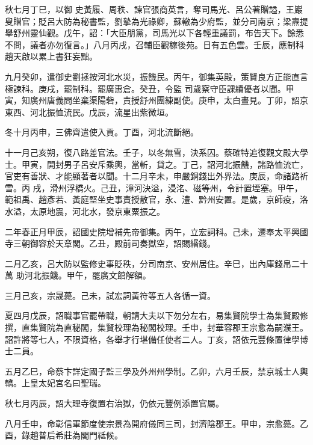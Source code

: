 \begin{pinyinscope}
 秋七月丁巳，以御
 史黃履、周秩、諫官張商英言，奪司馬光、呂公著贈謚，王巖叟贈官；貶呂大防為秘書監，劉摯為光祿卿，蘇轍為少府監，並分司南京；梁燾提舉舒州靈仙觀。戊午，詔：「大臣朋黨，司馬光以下各輕重議罰，布告天下。餘悉不問，議者亦勿復言。」八月丙戌，召輔臣觀稼後苑。日有五色雲。壬辰，應制科趙天啟以累上書狂妄黜。



 九月癸卯，遣御史劉拯按河北水災，振饑民。丙午，御集英殿，策賢良方正能直言極諫科。庚戌，罷制科。罷廣惠倉。癸丑，令監
 司歲察守臣課績優者以聞。甲寅，知廣州唐義問坐棄渠陽砦，責授舒州團練副使。庚申，太白晝見。丁卯，詔京東西、河北振恤流民。戊辰，流星出紫微垣。



 冬十月丙申，三佛齊遣使入貢。丁酉，河北流斷絕。



 十一月己亥朔，復八路差官法。壬子，以冬無雪，決系囚。蔡確特追復觀文殿大學士。甲寅，開封男子呂安斥乘輿，當斬，貸之。丁己，詔河北振饑，諸路恤流亡，官吏有善狀、才能顯著者以聞。十二月辛未，申嚴銅錢出外界法。庚辰，命諸路祈雪。丙
 戌，滑州浮橋火。己丑，漳河決溢，浸洺、磁等州，令計置堙塞。甲午，範祖禹、趙彥若、黃庭堅坐史事責授散官，永、澧、黔州安置。是歲，京師疫，洛水溢，太原地震，河北水，發京東粟振之。



 二年春正月甲辰，詔國史院增補先帝御集。丙午，立宏詞科。己未，遷奉太平興國寺三朝御容於天章閣。乙丑，殿前司奏獄空，詔賜緡錢。



 二月乙亥，呂大防以監修史事貶秩，分司南京、安州居住。辛巳，出內庫錢帛二十萬
 助河北振饑。甲午，罷廣文館解額。



 三月己亥，宗晟薨。己未，試宏詞黃符等五人各循一資。



 夏四月戊辰，詔職事官罷帶職，朝請大夫以下勿分左右，易集賢院學士為集賢殿修撰，直集賢院為直秘閣，集賢校理為秘閣校理。壬申，封華容郡王宗愈為嗣濮王。詔許將等七人，不限資格，各舉才行堪備任使者二人。丁亥，詔依元豐條置律學博士二員。



 五月乙巳，命蔡卞詳定國子監三學及外州州學制。乙卯，六月壬辰，禁京城士人輿轎。上皇太妃宮名曰聖瑞。



 秋七月丙辰，詔大理寺復置右治獄，仍依元豐例添置官屬。



 八月壬申，命彰信軍節度使宗景為開府儀同三司，封濟陰郡王。甲申，宗愈薨。乙酉，錄趙普后希莊為閣門祗候。




\end{pinyinscope}
